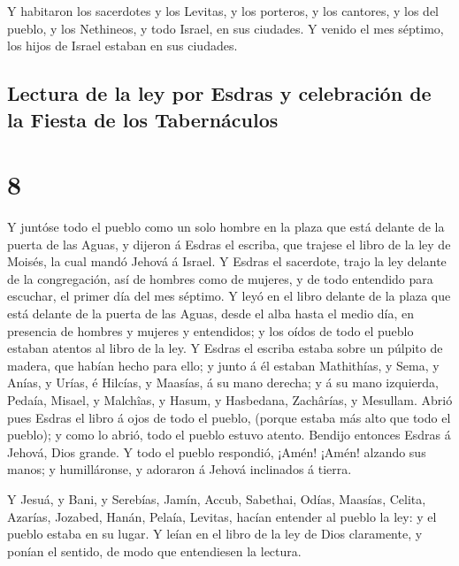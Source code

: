  Y habitaron los sacerdotes y los Levitas, y los porteros,
y los cantores, y los del pueblo, y los Nethineos, y todo Israel, en sus
ciudades. Y venido el mes séptimo, los hijos de Israel estaban en sus
ciudades.

\hypertarget{lectura-de-la-ley-por-esdras-y-celebraciuxf3n-de-la-fiesta-de-los-tabernuxe1culos}{%
\subsection{Lectura de la ley por Esdras y celebración de la Fiesta de
los
Tabernáculos}\label{lectura-de-la-ley-por-esdras-y-celebraciuxf3n-de-la-fiesta-de-los-tabernuxe1culos}}

\hypertarget{section-7}{%
\section{8}\label{section-7}}

 Y juntóse todo el pueblo como un solo hombre en la plaza
que está delante de la puerta de las Aguas, y dijeron á Esdras el
escriba, que trajese el libro de la ley de Moisés, la cual mandó Jehová
á Israel.  Y Esdras el sacerdote, trajo la ley delante de la
congregación, así de hombres como de mujeres, y de todo entendido para
escuchar, el primer día del mes séptimo.  Y leyó en el libro
delante de la plaza que está delante de la puerta de las Aguas, desde el
alba hasta el medio día, en presencia de hombres y mujeres y entendidos;
y los oídos de todo el pueblo estaban atentos al libro de la ley.
 Y Esdras el escriba estaba sobre un púlpito de madera, que
habían hecho para ello; y junto á él estaban Mathithías, y Sema, y
Anías, y Urías, é Hilcías, y Maasías, á su mano derecha; y á su mano
izquierda, Pedaía, Misael, y Malchîas, y Hasum, y Hasbedana, Zachârías,
y Mesullam.  Abrió pues Esdras el libro á ojos de todo el
pueblo, (porque estaba más alto que todo el pueblo); y como lo abrió,
todo el pueblo estuvo atento.  Bendijo entonces Esdras á
Jehová, Dios grande. Y todo el pueblo respondió, ¡Amén! ¡Amén! alzando
sus manos; y humilláronse, y adoraron á Jehová inclinados á tierra.

 Y Jesuá, y Bani, y Serebías, Jamín, Accub, Sabethai, Odías,
Maasías, Celita, Azarías, Jozabed, Hanán, Pelaía, Levitas, hacían
entender al pueblo la ley: y el pueblo estaba en su lugar. 
Y leían en el libro de la ley de Dios claramente, y ponían el sentido,
de modo que entendiesen la lectura.

